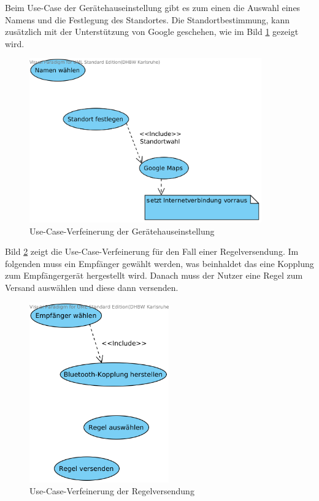 Beim Use-Case der Ger\"atehauseinstellung gibt es zum einen die Auswahl eines Namens und die Festlegung des Standortes. Die Standortbestimmung, kann zus\"atzlich mit der Unterst\"utzung von Google geschehen, wie im Bild \ref{Geraetehauseinstellung Use Case} gezeigt wird.
\begin{figure}[!ht]
\centering
\includegraphics[width=10cm]{Bilder/UseCaseGeraetehauseinstellung.png}
\caption{Use-Case-Verfeinerung der Ger\"atehauseinstellung}
\label{Geraetehauseinstellung Use Case}
\centering
\end{figure}

\newpage

Bild \ref{Regelversendung Use Case} zeigt die Use-Case-Verfeinerung f\"ur den Fall einer Regelversendung. Im folgenden muss ein Empf\"anger gew\"ahlt werden, was beinhaldet das eine Kopplung zum Empf\"angerger\"at hergestellt wird. Danach muss der Nutzer eine Regel zum Versand ausw\"ahlen und diese dann versenden. 
\begin{figure}[!ht]
\centering
\includegraphics[width=6cm]{Bilder/UseCaseRegelVersenden.png}
\caption{Use-Case-Verfeinerung der Regelversendung}
\label{Regelversendung Use Case}
\centering
\end{figure}


